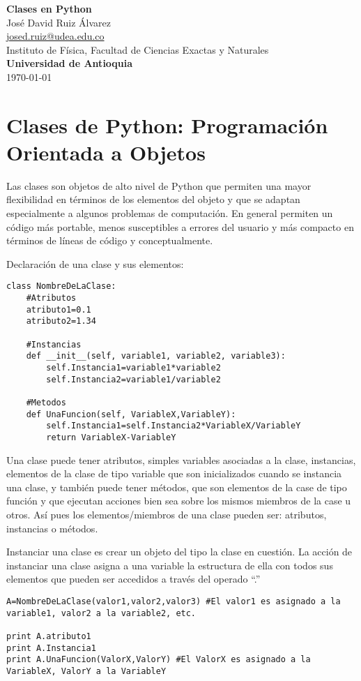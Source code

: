 \documentclass[10.5pt]{article}
\begin{document}
\noindent
\begin{minipage}[b]{0.75\linewidth}
{\LARGE\bf Clases en Python}\\ %
\large{Jos\'{e} David Ruiz \'{A}lvarez} \\
\small{\href{mailto:josed.ruiz@udea.edu.co}{josed.ruiz@udea.edu.co}} \\ %
\normalsize{Instituto de Física, Facultad de Ciencias Exactas y Naturales} \\%
\normalsize{\bf Universidad de Antioquia} \\[8mm]
\today %
\end{minipage}%


\section{Clases de Python: Programación Orientada a Objetos}

Las clases son objetos de alto nivel de Python que permiten una mayor flexibilidad en términos de los elementos del objeto y que se adaptan especialmente a algunos problemas de computación. En general permiten un código más portable, menos susceptibles a errores del usuario y más compacto en términos de líneas de código y conceptualmente.

Declaración de una clase y sus elementos:
\begin{verbatim}
class NombreDeLaClase:
    #Atributos
    atributo1=0.1
    atributo2=1.34

    #Instancias
    def __init__(self, variable1, variable2, variable3):
        self.Instancia1=variable1*variable2
        self.Instancia2=variable1/variable2

    #Metodos
    def UnaFuncion(self, VariableX,VariableY):
        self.Instancia1=self.Instancia2*VariableX/VariableY
        return VariableX-VariableY
\end{verbatim}

Una clase puede tener atributos, simples variables asociadas a la clase, instancias, elementos de la clase de tipo variable que son inicializados cuando se instancia una clase, y también puede tener métodos, que son elementos de la case de tipo función y que ejecutan acciones bien sea sobre los mismos miembros de la case u otros. Así pues los elementos/miembros de una clase pueden ser: atributos, instancias o métodos.

Instanciar una clase es crear un objeto del tipo la clase en cuestión. La acción de instanciar una clase asigna a una variable la estructura de ella con todos sus elementos que pueden ser accedidos a través del operado ``.''
\begin{verbatim}
A=NombreDeLaClase(valor1,valor2,valor3) #El valor1 es asignado a la variable1, valor2 a la variable2, etc.

print A.atributo1
print A.Instancia1
print A.UnaFuncion(ValorX,ValorY) #El ValorX es asignado a la VariableX, ValorY a la VariableY
\end{verbatim}
 
\end{document}
